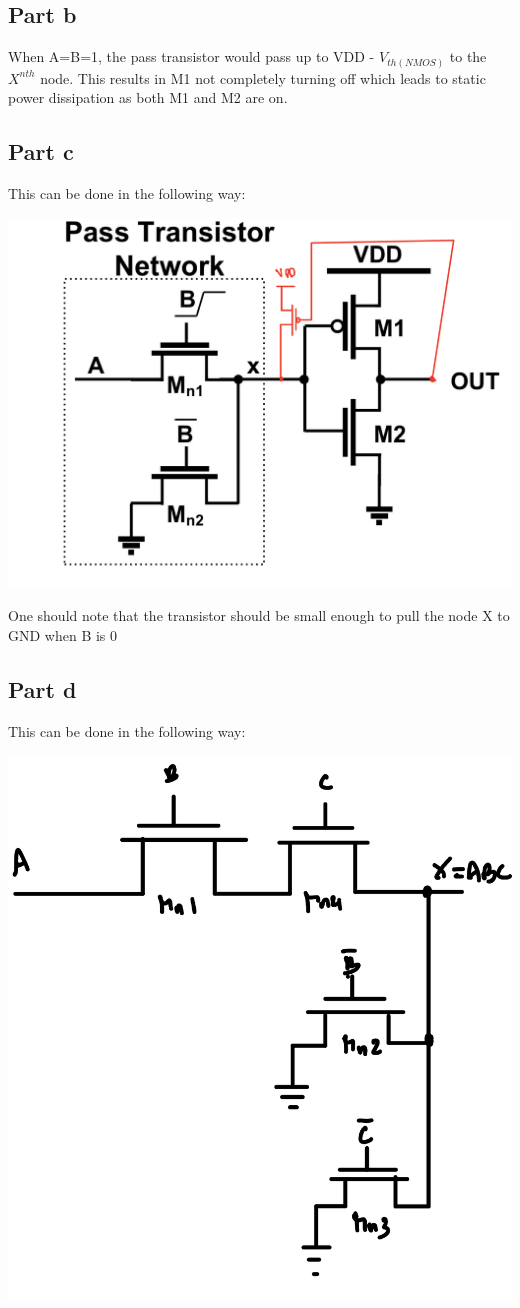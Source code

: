 \documentclass{article}
\begin{document}
\subsection*{Part b}
When A=B=1, the pass transistor would pass up to VDD - $V_{th(NMOS)}$ to the $X^{nth}$ node.
This results in M1 not completely turning off which leads to static power dissipation as both
M1 and M2 are on.

\subsection*{Part c}
This can be done in the following way:

\includegraphics[scale = 0.15]{q2pc.jpeg}

One should note that the transistor should be small enough to pull the node X to GND
when B is 0

\subsection*{Part d}
This can be done in the following way:

\includegraphics[scale = 0.15]{q2pd.jpeg}
\end{document}
